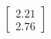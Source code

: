 \documentclass[preview]{standalone}
\begin{document}
\begin{align*}
\begin{bmatrix} 2.21 \\ 2.76 \end{bmatrix}
\end{align*}
\end{document}
